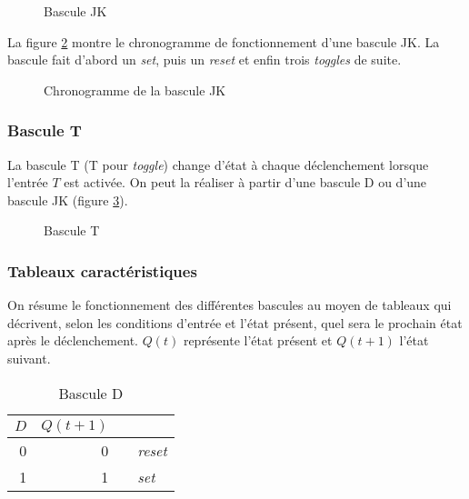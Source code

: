 \documentclass[11pt]{article}
\begin{document}
\begin{figure}[htbp]
\centering

\caption{\label{fig:org9fef988}Bascule JK}
\end{figure}

La figure \ref{fig:org1f2801a} montre le chronogramme de fonctionnement
d'une bascule JK. La bascule fait d'abord un \emph{set}, puis un \emph{reset} et
enfin trois \emph{toggles} de suite.

\begin{figure}[htbp]
\centering

\caption{\label{fig:org1f2801a}Chronogramme de la bascule JK}
\end{figure}

\subsubsection{Bascule T}
\label{sec:org55a11bd}

La bascule T (T pour \emph{toggle}) change d'état à chaque déclenchement
lorsque l'entrée \(T\) est activée. On peut la réaliser à partir d'une
bascule D ou d'une bascule JK (figure \ref{fig:org4738964}).

\begin{figure}[htbp]
\centering

\caption{\label{fig:org4738964}Bascule T}
\end{figure}

\subsubsection{Tableaux caractéristiques}
\label{sec:org910ef8e}

On résume le fonctionnement des différentes bascules au moyen de
tableaux qui décrivent, selon les conditions d'entrée et l'état
présent, quel sera le prochain état après le déclenchement. \(Q(t)\)
représente l'état présent et \(Q(t+1)\) l'état suivant.

\begin{table}[htbp]
\caption{\label{tab:org4560c92}Bascule D}
\centering
\begin{tabular}{rrll}
\(D\) & \(Q(t+1)\) &  & \\[0pt]
\hline
0 & 0 &  & \emph{reset}\\[0pt]
1 & 1 &  & \emph{set}\\[0pt]
\end{tabular}
\end{table}
\end{document}
